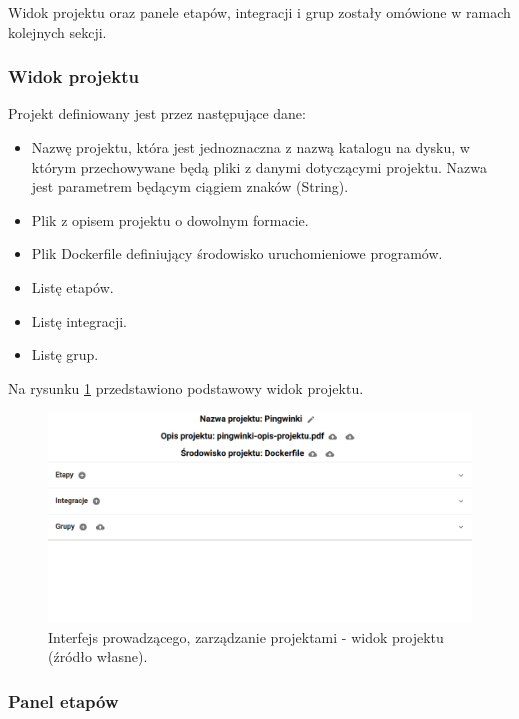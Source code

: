 Widok projektu oraz panele etapów, integracji i grup zostały omówione w ramach kolejnych sekcji.

\subsubsection{Widok projektu}

Projekt definiowany jest przez następujące dane:
\begin {itemize}
    \item Nazwę projektu, która jest jednoznaczna z nazwą katalogu na dysku, w którym przechowywane będą pliki z danymi dotyczącymi projektu.
    Nazwa jest parametrem będącym ciągiem znaków (String).
    \item Plik z opisem projektu o dowolnym formacie.
    \item Plik Dockerfile definiujący środowisko uruchomieniowe programów.
    \item Listę etapów.
    \item Listę integracji.
    \item Listę grup.
\end {itemize}

Na rysunku \ref{fig:lecturer_project_board} przedstawiono podstawowy widok projektu.

\begin{figure}[h]
    \centering
    \includegraphics[width = 13cm]{chapter04/lecturer_project_board.png}
    \caption{Interfejs prowadzącego, zarządzanie projektami - widok projektu (źródło własne).}
    \label{fig:lecturer_project_board}
\end{figure}

\subsubsection{Panel etapów}

